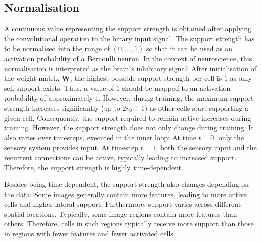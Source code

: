 \subsection{Normalisation}
A continuous value representing the support strength is obtained after applying the convolutional operation to the binary input signal.
The support strength has to be normalised into the range of $(0, ..., 1)$ so that it can be used as an activation probability of a Bernoulli neuron.
In the context of neuroscience, this normalisation is interpreted as the brain's inhibitory signal:
After initialisation of the weight matrix $\boldsymbol{W}$, the highest possible support strength per cell is $1$ as only self-support exists. Thus, a value of $1$ should be mapped to an activation probability of approximately $1$. However, during training, the maximum support strength increases significantly (up to $2n_l + 1$) as other cells start supporting a given cell.
Consequently, the support required to remain active increases during training.
However, the support strength does not only change during training. It also varies over timesteps, executed in the inner loop: At time $t=0$, only the sensory system provides input. At timestep $t=1$, both the sensory input and the recurrent connections can be active, typically leading to increased support. Therefore, the support strength is highly time-dependent.

Besides being time-dependent, the support strength also changes depending on the data:
Some images generally contain more features, leading to more active cells and higher lateral support. Furthermore, support varies across different spatial locations. Typically, some image regions contain more features than others. Therefore, cells in such regions typically receive more support than those in regions with fewer features and fewer activated cells.

